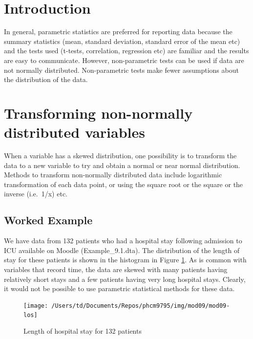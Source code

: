\documentclass[
]{memoir}
\begin{document}
\hypertarget{introduction-8}{%
\section{Introduction}\label{introduction-8}}

In general, parametric statistics are preferred for reporting data because the summary statistics (mean, standard deviation, standard error of the mean etc) and the tests used (t-tests, correlation, regression etc) are familiar and the results are easy to communicate. However, non-parametric tests can be used if data are not normally distributed. Non-parametric tests make fewer assumptions about the distribution of the data.

\hypertarget{transforming-non-normally-distributed-variables}{%
\section{Transforming non-normally distributed variables}\label{transforming-non-normally-distributed-variables}}

When a variable has a skewed distribution, one possibility is to transform the data to a new variable to try and obtain a normal or near normal distribution. Methods to transform non-normally distributed data include logarithmic transformation of each data point, or using the square root or the square or the inverse (i.e.~1/x) etc.

\hypertarget{worked-example-12}{%
\subsection{Worked Example}\label{worked-example-12}}

We have data from 132 patients who had a hospital stay following admission to ICU available on Moodle (Example\_9.1.dta). The distribution of the length of stay for these patients is shown in the histogram in Figure \ref{fig:mod09-los}. As is common with variables that record time, the data are skewed with many patients having relatively short stays and a few patients having very long hospital stays. Clearly, it would not be possible to use parametric statistical methods for these data.

\begin{figure}
\texttt{[image: /Users/td/Documents/Repos/phcm9795/img/mod09/mod09-los]} \caption{Length of hospital stay for 132 patients}\label{fig:mod09-los}
\end{figure}
\end{document}

